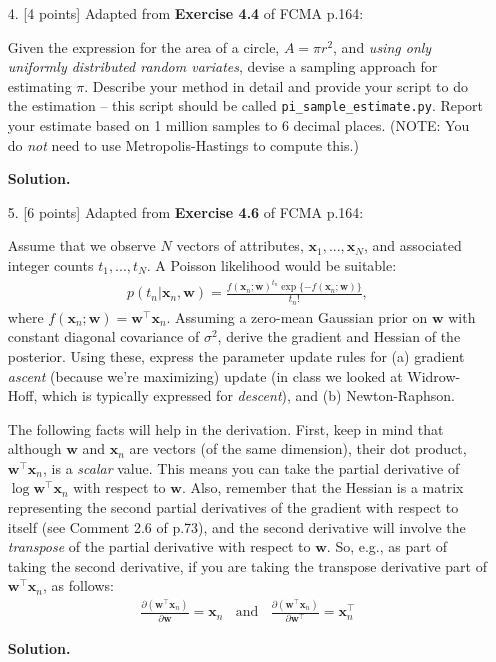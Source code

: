 \documentclass[10pt]{article}
\begin{document}
\begin{itemize}
{\bf Solution.}




\item[4.]  [4 points]
Adapted from {\bf Exercise 4.4} of FCMA p.164:

Given the expression for the area of a circle, $A = \pi r^2$, and {\em using only uniformly distributed random variates}, devise a sampling approach for estimating $\pi$.  Describe your method in detail and provide your script to do the estimation -- this script should be called {\tt pi\_sample\_estimate.py}.  Report your estimate based on 1 million samples to 6 decimal places.  (NOTE: You do {\em not} need to use Metropolis-Hastings to compute this.)

{\bf Solution.} %




\item[5.]  [6 points]
Adapted from {\bf Exercise 4.6} of FCMA p.164:

Assume that we observe $N$ vectors of attributes, $\mathbf{x}_1, ..., \mathbf{x}_N$, and associated integer counts $t_1, ..., t_N$.  A Poisson likelihood would be suitable:
\begin{eqnarray*}
p(t_n | \mathbf{x}_n, \mathbf{w}) = \frac{f(\mathbf{x}_n; \mathbf{w})^{t_n} \exp \{ -f(\mathbf{x}_n; \mathbf{w}) \}}{t_n!},
\end{eqnarray*}
where $f(\mathbf{x}_n;\mathbf{w}) = \mathbf{w}^\top\mathbf{x}_n$.
Assuming a zero-mean Gaussian prior on $\mathbf{w}$ with constant diagonal covariance of $\sigma^2$, derive the gradient and Hessian of the posterior.  Using these, express the parameter update rules for (a) gradient {\em ascent} (because we're maximizing) update (in class we looked at Widrow-Hoff, which is typically expressed for {\em descent}), and (b) Newton-Raphson.

The following facts will help in the derivation.  First, keep in mind that although $\mathbf{w}$ and $\mathbf{x}_n$ are vectors (of the same dimension), their dot product, $\mathbf{w}^\top\mathbf{x}_n$, is a {\em scalar} value.  This means you can take the partial derivative of $\log \mathbf{w}^\top\mathbf{x}_n$ with respect to $\mathbf{w}$.  Also, remember that the Hessian is a matrix representing the second partial derivatives of the gradient with respect to itself (see Comment 2.6 of p.73), and the second derivative will involve the {\em transpose} of the partial derivative with respect to $\mathbf{w}$.  So, e.g., as part of taking the second derivative, if you are taking the transpose derivative part of $\mathbf{w}^\top\mathbf{x}_n$, as follows:
\begin{eqnarray*}
\frac{\partial (\mathbf{w}^\top \mathbf{x}_n)}{\partial \mathbf{w}} = \mathbf{x}_n
~~~~\mathrm{and}~~~~
\frac{\partial (\mathbf{w}^\top \mathbf{x}_n)}{\partial \mathbf{w}^\top} = \mathbf{x}_n^\top
\end{eqnarray*}

{\bf Solution.} %


\end{itemize}
\end{document}
